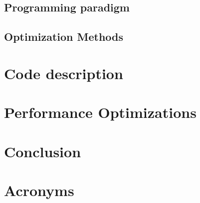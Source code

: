 \documentclass[12pt,oneside,bibtotoc,liststotoc]{scrbook}
\begin{document}
\section{Programming paradigm}

\section{Optimization Methods}



\chapter{Code description}




\chapter{Performance Optimizations}







\chapter{Conclusion}

\newpage


\chapter{Acronyms}

\end{document}
